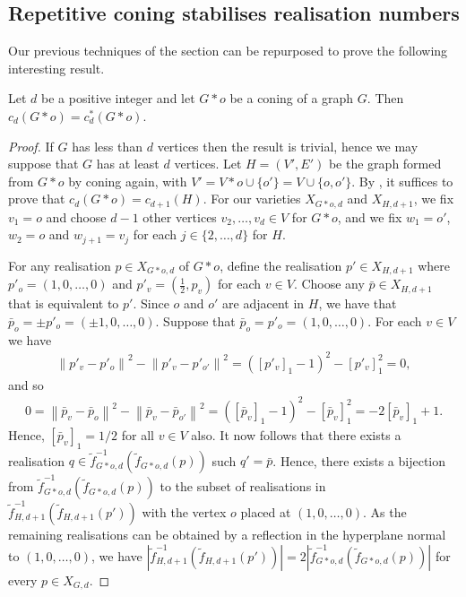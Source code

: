 \documentclass[ALCO]{cedram}
\begin{document}
\subsection{Repetitive coning stabilises realisation numbers}

Our previous techniques of the section can be repurposed to prove the following interesting result.

\begin{theorem}\label{t:conecount2}
	Let $d$ be a positive integer and let $G*o$ be a coning of a graph $G$.
	Then $c_{d}(G*o) = c_{d}^*(G*o)$.
\end{theorem}

\begin{proof}
	If $G$ has less than $d$ vertices then the result is trivial,
	hence we may suppose that $G$ has at least $d$ vertices.
	Let $H = (V',E')$ be the graph formed from $G*o$ by coning again,
	with $V' = V*o \cup \{o'\} = V \cup \{o,o'\}$.
	By ,
	it suffices to prove that $c_d(G*o) = c_{d+1}(H)$.
	For our varieties $X_{G*o,d}$ and $X_{H,d+1}$,
	we fix $v_1 = o$ and choose $d-1$ other vertices $v_2,\ldots,v_d \in V$ for $G*o$,
	and we fix $w_1 = o'$, $w_2 = o$ and $w_{j+1} = v_j$ for each $j \in \{2,\ldots,d\}$ for $H$.
	
	For any realisation $p \in X_{G*o,d}$ of $G*o$,
	define the realisation $p' \in X_{H,d+1}$ where $p'_o = (1,0,\ldots,0)$ and $p'_v = (\frac{1}{2},p_v)$ for each $v \in V$.
	Choose any $\bar{p} \in X_{H,d+1}$ that is equivalent to $p'$.
	Since $o$ and $o'$ are adjacent in $H$,
	we have that $\bar{p}_o = \pm p'_o = (\pm 1,0,\ldots,0)$.
	Suppose that $\bar{p}_o = p'_o= (1,0,\ldots,0)$.
	For each $v \in V$ we have
	\begin{align*} 
		\left\| p'_v-p'_{o} \right\|^2 -  \left\|p'_v-p'_{o'} \right\|^2 =  \left([p'_v]_1 - 1\right)^2 -  [p'_v]_1^2 = 0,
	\end{align*}
	and so
	\begin{align*} 
		0 = \left\|\bar{p}_v-\bar{p}_{o} \right\|^2 - \left\|\bar{p}_v-\bar{p}_{o'} \right\|^2 = \left([\bar{p}_v]_1 - 1 \right)^2 - [\bar{p}_v]_1^2  = -2[\bar{p}_v]_1 +1.
	\end{align*}
	Hence, $[\bar{p}_v]_1 = 1/2$ for all $v \in V$ also.
	It now follows that there exists a realisation $q \in \tilde{f}_{G*o,d}^{-1}(\tilde{f}_{G*o,d}(p))$ such $q' = \bar{p}$.
	Hence, there exists a bijection from $\tilde{f}_{G*o,d}^{-1}(\tilde{f}_{G*o,d}(p))$ to the subset of realisations in $\tilde{f}_{H,d+1}^{-1}(\tilde{f}_{H,d+1}(p'))$ with the vertex $o$ placed at $(1,0,\ldots,0)$.
	As the remaining realisations can be obtained by a reflection in the hyperplane normal to $(1,0,\ldots,0)$,
	we have $|\tilde{f}_{H,d+1}^{-1}(\tilde{f}_{H,d+1}(p'))| = 2|\tilde{f}_{G*o,d}^{-1}(\tilde{f}_{G*o,d}(p))|$ for every $p \in X_{G,d}$.
	

\end{proof}
\end{document}

